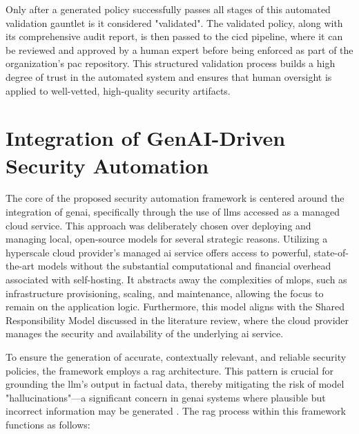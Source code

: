 Only after a generated policy successfully passes all stages of this automated validation gauntlet is it considered "validated". The validated policy, along with its comprehensive audit report, is then passed to the \gls{cicd} pipeline, where it can be reviewed and approved by a human expert before being enforced as part of the organization's \gls{pac} repository. This structured validation process builds a high degree of trust in the automated system and ensures that human oversight is applied to well-vetted, high-quality security artifacts.



\section{Integration of GenAI-Driven Security Automation} %
\label{sub:Integration of GenAI-Driven Security Automation}

The core of the proposed security automation framework is centered around the integration of \gls{genai}, specifically through the use of \glspl{llm} accessed as a managed cloud service. This approach was deliberately chosen over deploying and managing local, open-source models for several strategic reasons. Utilizing a hyperscale cloud provider's managed \gls{ai} service offers access to powerful, state-of-the-art models without the substantial computational and financial overhead associated with self-hosting. It abstracts away the complexities of \gls{mlops}, such as infrastructure provisioning, scaling, and maintenance, allowing the focus to remain on the application logic. Furthermore, this model aligns with the Shared Responsibility Model discussed in the literature review, where the cloud provider manages the security and availability of the underlying \gls{ai} service.

To ensure the generation of accurate, contextually relevant, and reliable security policies, the framework employs a \gls{rag} architecture. This pattern is crucial for grounding the \gls{llm}'s output in factual data, thereby mitigating the risk of model "hallucinations"—a significant concern in \gls{genai} systems where plausible but incorrect information may be generated \cite{noauthor_ground_nodate}. The \gls{rag} process within this framework functions as follows:

